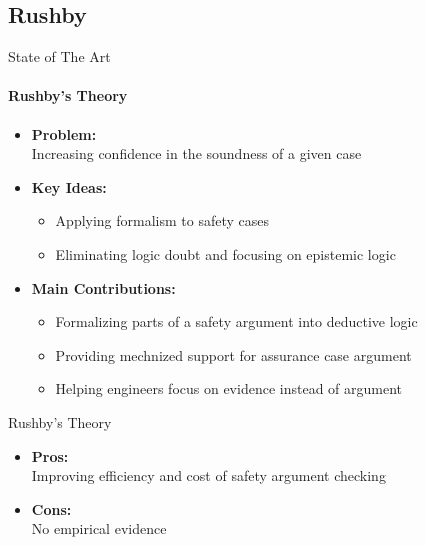 \documentclass[xcolor=x11names,compress]{beamer}
\renewcommand{\(}{\begin{columns}}
\renewcommand{\)}{\end{columns}}
\newcommand{\<}[1]{\begin{column}{#1}}
\renewcommand{\>}{\end{column}}
\begin{document}
\subsection{Rushby}
\begin{frame}{State of The Art}
\framesubtitle{Rushby's Theory \cite{Rushby:formalism}}
\begin{itemize}
\item \textbf{Problem:}\\Increasing confidence in the soundness of a given case
\item \textbf{Key Ideas:}
			\begin{itemize}
			\item Applying formalism to safety cases
			\item Eliminating logic doubt and focusing on epistemic logic
			\end{itemize}
\item \textbf{Main Contributions:}
\begin{itemize}
	\item Formalizing parts of a safety argument into deductive logic
	\item Providing mechnized support for assurance case argument
	\item Helping engineers focus on evidence instead of argument
\end{itemize}
\end{itemize}
\end{frame}

\begin{frame}{Rushby's Theory}
\begin{itemize}
\item \textbf{Pros:} \\
	Improving efficiency and cost of safety argument checking
\item \textbf{Cons:} \\
	No empirical evidence
\end{itemize}
\end{frame}

\end{document}
